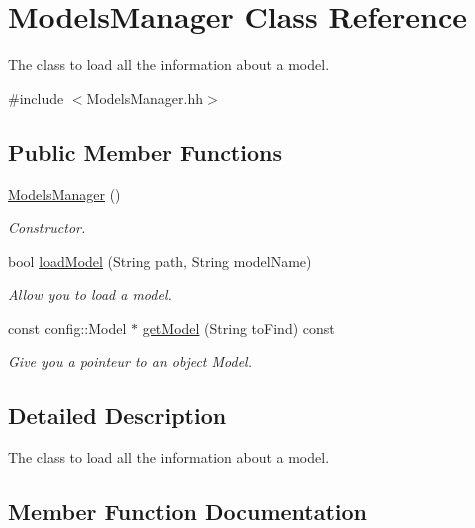 \hypertarget{classModelsManager}{}\section{Models\+Manager Class Reference}
\label{classModelsManager}


The class to load all the information about a model.  




{\ttfamily \#include $<$Models\+Manager.\+hh$>$}

\subsection*{Public Member Functions}
\begin{DoxyCompactItemize}
\item 
\mbox{\label{classModelsManager_a48f911933ce0a38aa78667e34e8098f4}} 
\hyperlink{classModelsManager_a48f911933ce0a38aa78667e34e8098f4}{Models\+Manager} ()
\begin{DoxyCompactList}\small\item\em Constructor. \end{DoxyCompactList}\item 
bool \hyperlink{classModelsManager_a54ac507f91b38c8270f96bca6c639846}{load\+Model} (String path, String model\+Name)
\begin{DoxyCompactList}\small\item\em Allow you to load a model. \end{DoxyCompactList}\item 
const config\+::\+Model $\ast$ \hyperlink{classModelsManager_a8fe0ee355c02692c538c7bae747b55a5}{get\+Model} (String to\+Find) const
\begin{DoxyCompactList}\small\item\em Give you a pointeur to an object Model. \end{DoxyCompactList}\end{DoxyCompactItemize}


\subsection{Detailed Description}
The class to load all the information about a model. 

\subsection{Member Function Documentation}
\mbox{\label{classModelsManager_a8fe0ee355c02692c538c7bae747b55a5}} 
